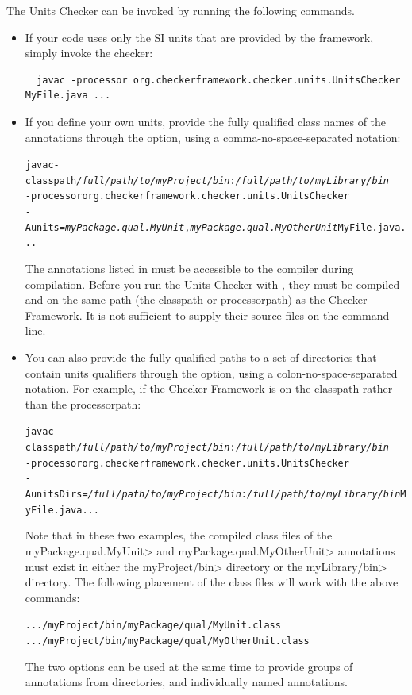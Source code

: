 
The Units Checker can be invoked by running the following commands.

\begin{itemize}
\item
If your code uses only the SI units that are provided by the
framework, simply invoke the checker:

\begin{Verbatim}
  javac -processor org.checkerframework.checker.units.UnitsChecker MyFile.java ...
\end{Verbatim}

\item
If you define your own units, provide the fully qualified class names of the
annotations through the  option, using a comma-no-space-separated
notation:

\begin{alltt}
  javac -classpath \textit{/full/path/to/myProject/bin}:\textit{/full/path/to/myLibrary/bin} \ttbs
        -processor org.checkerframework.checker.units.UnitsChecker \ttbs
        -Aunits=\textit{myPackage.qual.MyUnit},\textit{myPackage.qual.MyOtherUnit} MyFile.java ...
\end{alltt}

The annotations listed in  must be accessible to
the compiler during compilation.  Before you run the Units Checker with
, they must be compiled and on the same path (the classpath or
processorpath) as the Checker Framework.  It
is not sufficient to supply their source files on the command line.

\item
You can also provide the fully qualified paths to a set of directories
that contain units qualifiers through the  option,
using a colon-no-space-separated notation. For example,
if the Checker Framework is on the classpath rather than the processorpath:

\begin{alltt}
  javac -classpath \textit{/full/path/to/myProject/bin}:\textit{/full/path/to/myLibrary/bin} \ttbs
        -processor org.checkerframework.checker.units.UnitsChecker \ttbs
        -AunitsDirs=\textit{/full/path/to/myProject/bin}:\textit{/full/path/to/myLibrary/bin} MyFile.java ...
\end{alltt}

Note that in these two examples, the compiled class files of the
\<myPackage.qual.MyUnit> and \<myPackage.qual.MyOtherUnit> annotations
must exist in either the \<myProject/bin> directory or the
\<myLibrary/bin> directory. The following placement of the class files
will work with the above commands:

\begin{alltt}
  .../myProject/bin/myPackage/qual/MyUnit.class
  .../myProject/bin/myPackage/qual/MyOtherUnit.class
\end{alltt}

The two options can be used at the same time to provide groups of annotations
from directories, and individually named annotations.

\end{itemize}

